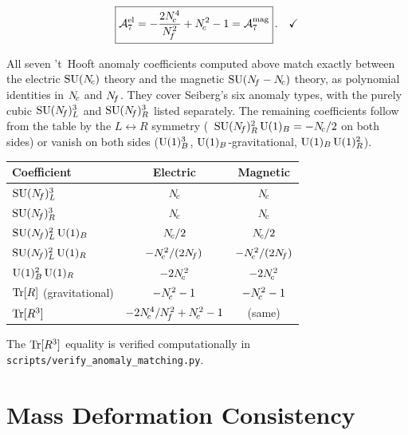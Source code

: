 \documentclass[11pt,a4paper]{article}
\begin{document}
\begin{equation}\label{eq:anom6b}
  \boxed{\mathcal{A}^{\text{el}}_{7}
    = -\frac{2N_{\!c}^4}{N_{\!f}^2} + N_{\!c}^2 - 1
    = \mathcal{A}^{\text{mag}}_{7}}\,.
  \quad\checkmark
\end{equation}

\begin{tcolorbox}[
  enhanced,
  colback=green!5!white,
  colframe=green!60!black,
  fonttitle=\bfseries,
  title={Anomaly Matching Summary}
]
All seven 't~Hooft anomaly coefficients computed above match exactly
between the electric $\mathrm{SU}(N_{\!c})$ theory and the magnetic $\mathrm{SU}(N_{\!f} - N_{\!c})$
theory, as polynomial identities in $N_{\!c}$ and $N_{\!f}$.  They cover Seiberg's
six anomaly types, with the purely cubic $\mathrm{SU}(N_{\!f})_L^3$ and $\mathrm{SU}(N_{\!f})_R^3$
listed separately.  The remaining coefficients follow from the table by the
$L \leftrightarrow R$ symmetry (\eg\ $\mathrm{SU}(N_{\!f})_R^2\,\mathrm{U}(1)_B = -N_{\!c}/2$ on
both sides) or vanish on both sides ($\mathrm{U}(1)_B^3$, $\mathrm{U}(1)_B$-gravitational,
$\mathrm{U}(1)_B\,\mathrm{U}(1)_R^2$).

\renewcommand{\arraystretch}{1.4}
\begin{center}
\begin{tabular}{l c c}
\toprule
\textbf{Coefficient} & \textbf{Electric} & \textbf{Magnetic} \\
\midrule
$\mathrm{SU}(N_{\!f})_L^3$ & $N_{\!c}$ & $N_{\!c}$ \\
$\mathrm{SU}(N_{\!f})_R^3$ & $N_{\!c}$ & $N_{\!c}$ \\
$\mathrm{SU}(N_{\!f})_L^2\,\mathrm{U}(1)_B$ & $N_{\!c}/2$ & $N_{\!c}/2$ \\
$\mathrm{SU}(N_{\!f})_L^2\,\mathrm{U}(1)_R$ & $-N_{\!c}^2/(2N_{\!f})$ & $-N_{\!c}^2/(2N_{\!f})$ \\
$\mathrm{U}(1)_B^2\,\mathrm{U}(1)_R$ & $-2N_{\!c}^2$ & $-2N_{\!c}^2$ \\
$\mathrm{Tr}[R]$ (gravitational) & $-N_{\!c}^2 - 1$ & $-N_{\!c}^2 - 1$ \\
$\mathrm{Tr}[R^3]$ & $-2N_{\!c}^4/N_{\!f}^2 + N_{\!c}^2 - 1$ & (same) \\
\bottomrule
\end{tabular}
\end{center}
The $\mathrm{Tr}[R^3]$ equality is verified computationally in
\texttt{scripts/verify\_anomaly\_matching.py}.
\end{tcolorbox}


\section{Mass Deformation Consistency}
\label{sec:mass-deformation}
\end{document}
